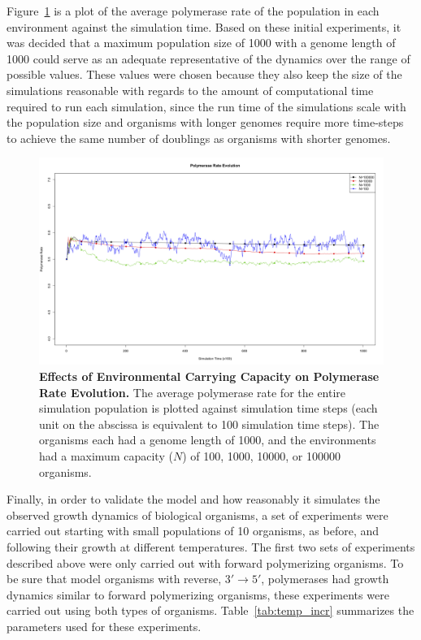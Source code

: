 Figure~\ref{fig:scale_num} is a plot of the average polymerase rate of the population in each environment against the simulation time. Based on these initial experiments, it was decided that a maximum population size of 1000 with a genome length of 1000 could serve as an adequate representative of the dynamics over the range of possible values. These values were chosen because they also keep the size of the simulations reasonable with regards to the amount of computational time required to run each simulation, since the run time of the simulations scale with the population size and organisms with longer genomes require more time-steps to achieve the same number of doublings as organisms with shorter genomes.

\begin{figure}[h]
	\centering
		\includegraphics[width=\textwidth]{scale_num}
	\caption{\textbf{Effects of Environmental Carrying Capacity on Polymerase Rate Evolution.} The average polymerase rate for the entire simulation population is plotted against simulation time steps (each unit on the abscissa is equivalent to 100 simulation time steps). The organisms each had a genome length of 1000, and the environments had a maximum capacity ($N$) of 100, 1000, 10000, or 100000 organisms.}
	\label{fig:scale_num}
\end{figure}

Finally, in order to validate the model and how reasonably it simulates the observed growth dynamics of biological organisms, a set of experiments were carried out starting with small populations of 10 organisms, as before, and following their growth at different temperatures. The first two sets of experiments described above were only carried out with forward polymerizing organisms. To be sure that model organisms with reverse, $3'\to5'$, polymerases had growth dynamics similar to forward polymerizing organisms, these experiments were carried out using both types of organisms. Table~\ref{tab:temp_incr} summarizes the parameters used for these experiments.

